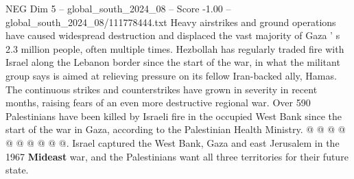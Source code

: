\begin{textsample}{NEG Dim 5 – global\_south\_2024\_08 – Score -1.00 – global\_south\_2024\_08/111778444.txt}
Heavy airstrikes and ground operations have caused widespread destruction and displaced the vast majority of Gaza ' s 2.3 million people, often multiple times.
Hezbollah has regularly traded fire with Israel along the Lebanon border since the start of the war, in what the militant group says is aimed at relieving pressure on its fellow Iran-backed ally, Hamas.
The continuous strikes and counterstrikes have grown in severity in recent months, raising fears of an even more destructive regional war.
Over 590 Palestinians have been killed by Israeli fire in the occupied West Bank since the start of the war in Gaza, according to the Palestinian Health Ministry. @ @ @ @ @ @ @ @ @ @.
Israel captured the West Bank, Gaza and east Jerusalem in the 1967 \textbf{Mideast} war, and the Palestinians want all three territories for their future state.

\end{textsample}
